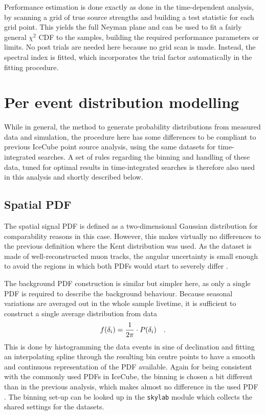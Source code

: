 Performance estimation is done exactly as done in the time-dependent analysis, by scanning a grid of true source strengths and building a test statistic for each grid point.
This yields the full Neyman plane and can be used to fit a fairly general $\chi^2$ CDF to the samples, building the required performance parameters or limits.
No post trials are needed here because no grid scan is made.
Instead, the spectral index is fitted, which incorporates the trial factor automatically in the fitting procedure.


\section{Per event distribution modelling}
While in general, the method to generate probability distributions from measured data and simulation, the procedure here has some differences to be compliant to previous IceCube point source analysis, using the same datasets for time-integrated searches.
A set of rules regarding the binning and handling of these data, tuned for optimal results in time-integrated searches is therefore also used in this analysis and shortly described below.

\subsection*{Spatial PDF}
The spatial signal PDF is defined as a two-dimensional Gaussian distribution for comparability reasons in this case.
However, this makes virtually no differences to the previous definition where the Kent distribution was used.
As the dataset is made of well-reconstructed muon tracks, the angular uncertainty is small enough to avoid the regions in which both PDFs would start to severely differ .

The background PDF construction is similar but simpler here, as only a single PDF is required to describe the background behaviour.
Because seasonal variations are averaged out in the whole sample livetime, it is sufficient to construct a single average distribution from data
\begin{equation}
  f(\delta_i) = \frac{1}{2\pi}\cdot P(\delta_i)
  \quad\text{.}
\end{equation}
This is done by histogramming the data events in sine of declination and fitting an interpolating spline through the resulting bin centre points to have a smooth and continuous representation of the PDF available.
Again for being consistent with the commonly used PDFs in IceCube, the binning is chosen a bit different than in the previous analysis, which makes almost no difference in the used PDF .
The binning set-up can be looked up in the \lstinline!skylab! module which collects the shared settings for the datasets.


